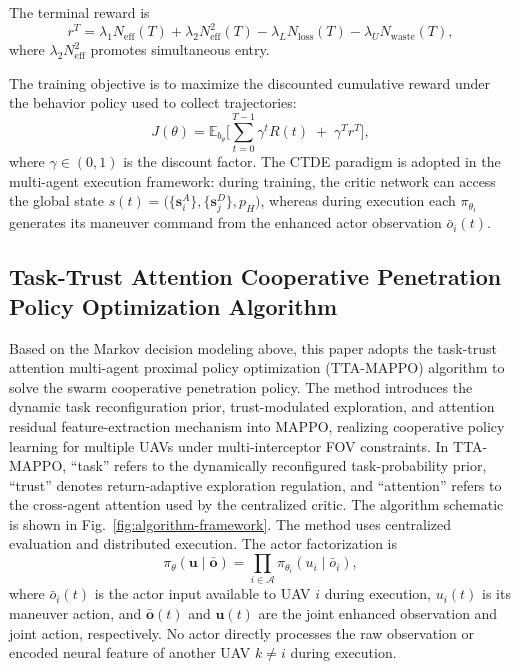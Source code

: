 \documentclass{cja}
\begin{document}
The terminal reward is
\begin{equation}
r^{T}=\lambda_1 N_{\mathrm{eff}}(T)+\lambda_2 N_{\mathrm{eff}}^{2}(T)
-\lambda_L N_{\mathrm{loss}}(T)-\lambda_U N_{\mathrm{waste}}(T),
\label{eq:r-term}
\end{equation}
where $\lambda_2 N_{\mathrm{eff}}^{2}$ promotes simultaneous entry.

The training objective is to maximize the discounted cumulative reward under the behavior policy used to collect trajectories:
\begin{equation}
J(\theta)=\mathbb{E}_{b_\theta}\Biggl[\sum_{t=0}^{T-1}\gamma^{t} R(t)\;+\;\gamma^{T} r^{T}\Biggr],
\label{eq:rl-objective}
\end{equation}
where $\gamma\in(0,1)$ is the discount factor. The CTDE paradigm is adopted in the multi-agent execution framework: during training, the critic network can access the global state $s(t)=\bigl(\{\mathbf s_i^A\},\{\mathbf s_j^D\},p_H\bigr)$, whereas during execution each $\pi_{\theta_i}$ generates its maneuver command from the enhanced actor observation $\bar o_i(t)$.

\subsection{Task-Trust Attention Cooperative Penetration Policy Optimization Algorithm}
\label{subsubsec:rta-mappo}

Based on the Markov decision modeling above, this paper adopts the task-trust attention multi-agent proximal policy optimization (TTA-MAPPO) algorithm to solve the swarm cooperative penetration policy. The method introduces the dynamic task reconfiguration prior, trust-modulated exploration, and attention residual feature-extraction mechanism into MAPPO, realizing cooperative policy learning for multiple UAVs under multi-interceptor FOV constraints. In TTA-MAPPO, ``task'' refers to the dynamically reconfigured task-probability prior, ``trust'' denotes return-adaptive exploration regulation, and ``attention'' refers to the cross-agent attention used by the centralized critic. The algorithm schematic is shown in Fig.~\ref{fig:algorithm-framework}.
The method uses centralized evaluation and distributed execution. The actor factorization is
\begin{equation}
\pi_\theta(\mathbf u\mid\bar{\mathbf o})
=
\prod_{i\in\mathcal A}
\pi_{\theta_i}(u_i\mid\bar o_i),
\end{equation}
where $\bar o_i(t)$ is the actor input available to UAV $i$ during execution, $u_i(t)$ is its maneuver action, and $\bar{\mathbf o}(t)$ and $\mathbf u(t)$ are the joint enhanced observation and joint action, respectively. No actor directly processes the raw observation or encoded neural feature of another UAV $k\ne i$ during execution.
\end{document}
